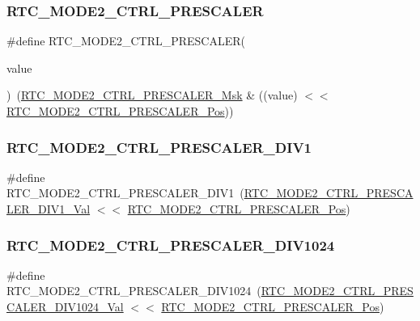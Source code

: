 \subsubsection{\texorpdfstring{RTC\_MODE2\_CTRL\_PRESCALER}{RTC\_MODE2\_CTRL\_PRESCALER}}
{\footnotesize\ttfamily \#define R\+T\+C\+\_\+\+M\+O\+D\+E2\+\_\+\+C\+T\+R\+L\+\_\+\+P\+R\+E\+S\+C\+A\+L\+ER(\begin{DoxyParamCaption}\item[{}]{value }\end{DoxyParamCaption})~(\mbox{\hyperlink{group___s_a_m_d21___r_t_c_ga9b4f584297c190f9dee12c8f7d1051be}{R\+T\+C\+\_\+\+M\+O\+D\+E2\+\_\+\+C\+T\+R\+L\+\_\+\+P\+R\+E\+S\+C\+A\+L\+E\+R\+\_\+\+Msk}} \& ((value) $<$$<$ \mbox{\hyperlink{group___s_a_m_d21___r_t_c_gab49acaac9629f089845263f149b8a6c0}{R\+T\+C\+\_\+\+M\+O\+D\+E2\+\_\+\+C\+T\+R\+L\+\_\+\+P\+R\+E\+S\+C\+A\+L\+E\+R\+\_\+\+Pos}}))}

\mbox{\label{group___s_a_m_d21___r_t_c_gadf73656ec44d678b4dd34d1d49dd5f76}} 
\subsubsection{\texorpdfstring{RTC\_MODE2\_CTRL\_PRESCALER\_DIV1}{RTC\_MODE2\_CTRL\_PRESCALER\_DIV1}}
{\footnotesize\ttfamily \#define R\+T\+C\+\_\+\+M\+O\+D\+E2\+\_\+\+C\+T\+R\+L\+\_\+\+P\+R\+E\+S\+C\+A\+L\+E\+R\+\_\+\+D\+I\+V1~(\mbox{\hyperlink{group___s_a_m_d21___r_t_c_ga8bcb27a42c2264c342c2516e9b00e121}{R\+T\+C\+\_\+\+M\+O\+D\+E2\+\_\+\+C\+T\+R\+L\+\_\+\+P\+R\+E\+S\+C\+A\+L\+E\+R\+\_\+\+D\+I\+V1\+\_\+\+Val}} $<$$<$ \mbox{\hyperlink{group___s_a_m_d21___r_t_c_gab49acaac9629f089845263f149b8a6c0}{R\+T\+C\+\_\+\+M\+O\+D\+E2\+\_\+\+C\+T\+R\+L\+\_\+\+P\+R\+E\+S\+C\+A\+L\+E\+R\+\_\+\+Pos}})}

\mbox{\label{group___s_a_m_d21___r_t_c_gafeb4cf17879d2a7ab1097b9a7d4ef573}} 
\subsubsection{\texorpdfstring{RTC\_MODE2\_CTRL\_PRESCALER\_DIV1024}{RTC\_MODE2\_CTRL\_PRESCALER\_DIV1024}}
{\footnotesize\ttfamily \#define R\+T\+C\+\_\+\+M\+O\+D\+E2\+\_\+\+C\+T\+R\+L\+\_\+\+P\+R\+E\+S\+C\+A\+L\+E\+R\+\_\+\+D\+I\+V1024~(\mbox{\hyperlink{group___s_a_m_d21___r_t_c_gac3c649a17480eeaef7097cd641d6d9d7}{R\+T\+C\+\_\+\+M\+O\+D\+E2\+\_\+\+C\+T\+R\+L\+\_\+\+P\+R\+E\+S\+C\+A\+L\+E\+R\+\_\+\+D\+I\+V1024\+\_\+\+Val}} $<$$<$ \mbox{\hyperlink{group___s_a_m_d21___r_t_c_gab49acaac9629f089845263f149b8a6c0}{R\+T\+C\+\_\+\+M\+O\+D\+E2\+\_\+\+C\+T\+R\+L\+\_\+\+P\+R\+E\+S\+C\+A\+L\+E\+R\+\_\+\+Pos}})}

